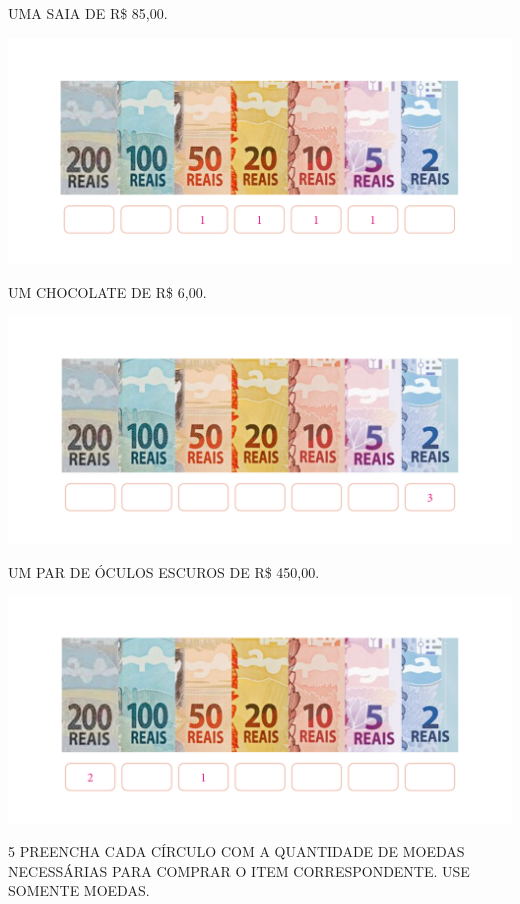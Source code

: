 \begin{escolha}
\item UMA SAIA DE R\$ 85,00.

\includegraphics[width=.8\textwidth]{../ilustracoes/MAT1/SAEB_1ANO_MAT_FIGURA74.png}

\item UM CHOCOLATE DE R\$ 6,00.

\includegraphics[width=.8\textwidth]{../ilustracoes/MAT1/SAEB_1ANO_MAT_FIGURA75.png}

\item UM PAR DE ÓCULOS ESCUROS DE R\$ 450,00.

\includegraphics[width=.8\textwidth]{../ilustracoes/MAT1/SAEB_1ANO_MAT_FIGURA76.png}
\end{escolha}


\pagebreak
\num{5} PREENCHA CADA CÍRCULO COM A QUANTIDADE DE MOEDAS NECESSÁRIAS PARA COMPRAR O ITEM CORRESPONDENTE. USE SOMENTE MOEDAS.

